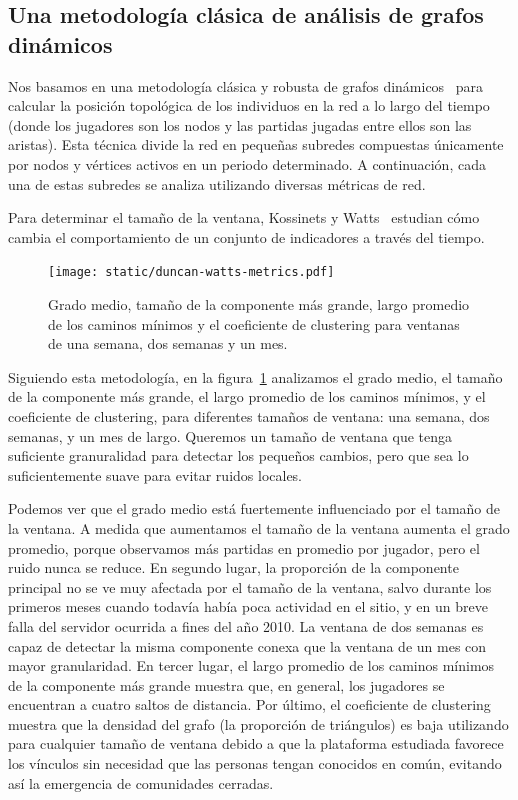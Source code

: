 \documentclass[a4paper,11pt]{book}
\theoremstyle{definition}
\begin{document}
\subsection{Una metodolog\'ia cl\'asica de an\'alisis de grafos din\'amicos}

Nos basamos en una metodolog\'ia cl\'asica y robusta de grafos din\'amicos~\cite{Kossinets2006, Mcgregor2014} para calcular la posici\'on topol\'ogica de los individuos en la red a lo largo del tiempo (donde los jugadores son los nodos y las partidas jugadas entre ellos son las aristas).
%
Esta t\'ecnica divide la red en peque\~nas subredes compuestas \'unicamente por nodos y v\'ertices activos en un periodo determinado.
%
A continuaci\'on, cada una de estas subredes se analiza utilizando diversas m\'etricas de red.


Para determinar el tama\~no de la ventana, Kossinets y Watts~\cite{Kossinets2006} estudian c\'omo cambia el comportamiento de un conjunto de indicadores a trav\'es del tiempo.
%
\begin{figure}[ht!]
	\texttt{[image: static/duncan-watts-metrics.pdf]}
	\caption{
	Grado medio, tama\~no de la componente m\'as grande,  largo promedio de los caminos m\'inimos y el coeficiente de clustering para ventanas de una semana, dos semanas y un mes.
	}
	\label{Figuras.DW}
\end{figure}
%
Siguiendo esta metodolog\'ia, en la figura~\ref{Figuras.DW} analizamos el grado medio, el tama\~no de la componente m\'as grande, el largo promedio de los caminos m\'inimos, y el coeficiente de clustering, para diferentes tama\~nos de ventana: una semana, dos semanas, y un mes de largo.
%
Queremos un tama\~no de ventana que tenga suficiente granuralidad para detectar los peque\~nos cambios, pero que sea lo suficientemente suave para evitar ruidos locales.


Podemos ver que el grado medio est\'a fuertemente influenciado por el tama\~no de la ventana.
%
A medida que aumentamos el tama\~no de la ventana aumenta el grado promedio, porque observamos m\'as partidas en promedio por jugador, pero el ruido nunca se reduce.
%
En segundo lugar, la proporci\'on de la componente principal no se ve muy afectada por el tama\~no de la ventana, salvo durante los primeros meses cuando todav\'ia hab\'ia poca actividad en el sitio, y en un breve falla del servidor ocurrida a fines del a\~no 2010.
%
La ventana de dos semanas es capaz de detectar la misma componente conexa que la ventana de un mes con mayor granularidad.
%
En tercer lugar, el largo promedio de los caminos m\'inimos de la componente m\'as grande muestra que, en general, los jugadores se encuentran a cuatro saltos de distancia.
%
Por \'ultimo, el coeficiente de clustering muestra que la densidad del grafo (la proporci\'on de tri\'angulos) es baja utilizando para cualquier tama\~no de ventana debido a que la plataforma estudiada favorece los v\'inculos sin necesidad que las personas tengan conocidos en com\'un, evitando as\'i la emergencia de comunidades cerradas.
\end{document}
